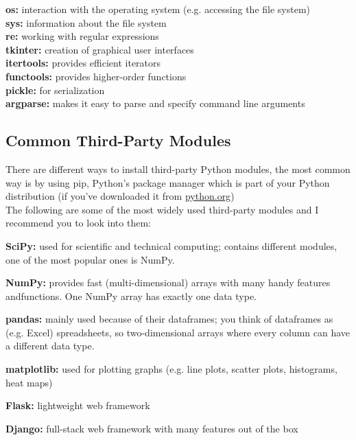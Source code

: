         \begin{indentblock}

            \textbf{os:} interaction with the operating system (e.g. accessing the file system) \\
            \textbf{sys:} information about the file system \\
            \textbf{re:} working with regular expressions \\
            \textbf{tkinter:} creation of graphical user interfaces \\
            \textbf{itertools:} provides efficient iterators \\
            \textbf{functools:} provides higher-order functions \\
            \textbf{pickle:} for serialization \\
            \textbf{argparse:} makes it easy to parse and specify command line arguments

        \end{indentblock}

    \subsection{Common Third-Party Modules}
        There are different ways to install third-party Python modules, the most common way is by
        using pip, Python's package manager which is part of your Python distribution
        (if you've downloaded it from \href{https://python.org}{python.org})\\
        The following are some of the most widely used third-party modules and I recommend you to
        look into them:

        \begin{indentblock}

            \textbf{SciPy:} used for scientific and technical computing; contains different modules,
            one of the most popular ones is NumPy.

            \textbf{NumPy:} provides fast (multi-dimensional) arrays with many handy
            features andfunctions. One NumPy array has exactly one data type.

            \textbf{pandas:} mainly used because of their dataframes; you think of dataframes
            as (e.g. Excel) spreadsheets, so two-dimensional arrays where every column can have a
            different data type.

            \textbf{matplotlib:} used for plotting graphs (e.g. line plots, scatter plots, histograms,
            heat maps)

            \textbf{Flask:} lightweight web framework

            \textbf{Django:} full-stack web framework with many features out of the box

        \end{indentblock}

